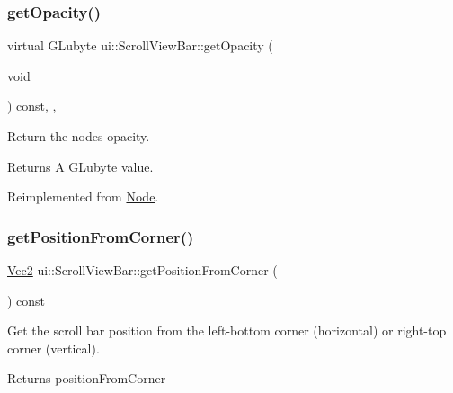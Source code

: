 \subsubsection{\texorpdfstring{get\+Opacity()}{getOpacity()}\hspace{0.1cm}{\footnotesize\ttfamily [2/2]}}
{\footnotesize\ttfamily virtual G\+Lubyte ui\+::\+Scroll\+View\+Bar\+::get\+Opacity (\begin{DoxyParamCaption}\item[{void}]{ }\end{DoxyParamCaption}) const\hspace{0.3cm}{\ttfamily [inline]}, {\ttfamily [override]}, {\ttfamily [virtual]}}

Return the node\textquotesingle{}s opacity. \begin{DoxyReturn}{Returns}
A G\+Lubyte value. 
\end{DoxyReturn}


Reimplemented from \hyperlink{classNode_ab999cce3763ea09e74014245c770ea97}{Node}.

\mbox{\label{classui_1_1ScrollViewBar_a4f78c98f3dc3b7d612796d26a2f9416d}} 
\subsubsection{\texorpdfstring{get\+Position\+From\+Corner()}{getPositionFromCorner()}\hspace{0.1cm}{\footnotesize\ttfamily [1/2]}}
{\footnotesize\ttfamily \hyperlink{classVec2}{Vec2} ui\+::\+Scroll\+View\+Bar\+::get\+Position\+From\+Corner (\begin{DoxyParamCaption}{ }\end{DoxyParamCaption}) const}



Get the scroll bar position from the left-\/bottom corner (horizontal) or right-\/top corner (vertical). 

\begin{DoxyReturn}{Returns}
position\+From\+Corner 
\end{DoxyReturn}
\mbox{\label{classui_1_1ScrollViewBar_a4f78c98f3dc3b7d612796d26a2f9416d}} 
